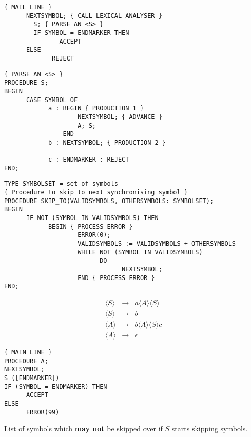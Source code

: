\documentclass[a4paper,12pt]{article}
\newcommand{\nonterminal}[1]{\langle #1 \rangle}
\begin{document}
\begin{verbatim}
{ MAIL LINE }
      NEXTSYMBOL; { CALL LEXICAL ANALYSER }
		S; { PARSE AN <S> }
		IF SYMBOL = ENDMARKER THEN 
		       ACCEPT
      ELSE
             REJECT	
\end{verbatim}

\begin{verbatim}
{ PARSE AN <S> }
PROCEDURE S;
BEGIN
      CASE SYMBOL OF
            a : BEGIN { PRODUCTION 1 }
                    NEXTSYMBOL; { ADVANCE }
                    A; S;
                END
            b : NEXTSYMBOL; { PRODUCTION 2 }

            c : ENDMARKER : REJECT
END;
\end{verbatim}

\begin{verbatim}
TYPE SYMBOLSET = set of symbols
{ Procedure to skip to next synchronising symbol }
PROCEDURE SKIP_TO(VALIDSYMBOLS, OTHERSYMBOLS: SYMBOLSET);
BEGIN
      IF NOT (SYMBOL IN VALIDSYMBOLS) THEN
            BEGIN { PROCESS ERROR }
                    ERROR(0);
                    VALIDSYMBOLS := VALIDSYMBOLS + OTHERSYMBOLS
                    WHILE NOT (SYMBOL IN VALIDSYMBOLS)
                          DO
                                NEXTSYMBOL;
                    END { PROCESS ERROR }
END;
\end{verbatim}

\begin{eqnarray}
\nonterminal{S}	&	\to	&	a \nonterminal{A} \nonterminal{S}		\\
\nonterminal{S}	&	\to	&	b													\\
\nonterminal{A}	&	\to	&	b \nonterminal{A} \nonterminal{S} c		\\
\nonterminal{A}	&	\to	&	\epsilon
\end{eqnarray}

\begin{verbatim}
{ MAIN LINE }
PROCEDURE A;
NEXTSYMBOL;
S ([ENDMARKER])
IF (SYMBOL = ENDMARKER) THEN
      ACCEPT
ELSE
      ERROR(99)
\end{verbatim}

List of symbols which \textbf{may not} be skipped over if $S$ starts
skipping symbols.
\end{document}
